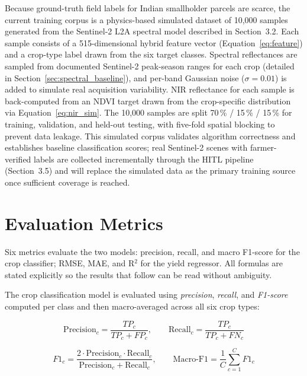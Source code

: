 \documentclass[12pt,a4paper,oneside]{report}
\begin{document}
Because ground-truth field labels for Indian smallholder parcels are scarce, the
current training corpus is a physics-based simulated dataset of 10,000 samples
generated from the Sentinel-2 L2A spectral model described in Section~3.2.
Each sample consists of a 515-dimensional hybrid feature vector
(Equation~\ref{eq:feature}) and a crop-type label drawn from the six target classes.
Spectral reflectances are sampled from documented Sentinel-2 peak-season ranges for
each crop (detailed in Section~\ref{sec:spectral_baseline}), and per-band Gaussian noise
($\sigma = 0.01$) is added to simulate real acquisition variability.
NIR reflectance for each sample is back-computed from an NDVI target drawn from the
crop-specific distribution via Equation~\ref{eq:nir_sim}.
The 10,000 samples are split 70\,\% / 15\,\% / 15\,\% for training, validation,
and held-out testing, with five-fold spatial blocking to prevent data leakage.
This simulated corpus validates algorithm correctness and establishes baseline
classification scores; real Sentinel-2 scenes with farmer-verified labels are
collected incrementally through the HITL pipeline (Section~3.5) and will replace
the simulated data as the primary training source once sufficient coverage is reached.

\section{Evaluation Metrics}
\label{sec:eval_metrics}

Six metrics evaluate the two models: precision, recall, and macro F1-score for the crop classifier; RMSE, MAE, and R$^2$ for the yield regressor. All formulas are stated explicitly so the results that follow can be read without ambiguity.

The crop classification model is evaluated using \textit{precision}, \textit{recall},
and \textit{F1-score} computed per class and then macro-averaged across all six
crop types:

\begin{equation}
\mathrm{Precision}_c = \frac{TP_c}{TP_c + FP_c}, \qquad
\mathrm{Recall}_c    = \frac{TP_c}{TP_c + FN_c}
\label{eq:prec_rec}
\end{equation}

\begin{equation}
F1_c = \frac{2 \cdot \mathrm{Precision}_c \cdot \mathrm{Recall}_c}
            {\mathrm{Precision}_c + \mathrm{Recall}_c}, \qquad
\mathrm{Macro\text{-}F1} = \frac{1}{C}\sum_{c=1}^{C} F1_c
\label{eq:f1}
\end{equation}
\end{document}
